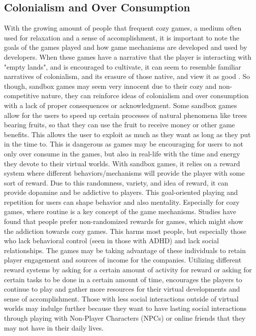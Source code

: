 \documentclass[10pt,twocolumn]{article}
\begin{document}
\subsection{Colonialism and Over Consumption}
With the growing amount of people that frequent cozy games, a medium often used for relaxation and a sense of accomplishment, it is important to note the goals of the games played and how game mechanisms are developed and used by developers. When these games have a narrative that the player is interacting with "empty lands", and is encouraged to cultivate, it can seem to resemble familiar narratives of colonialism, and its erasure of those native, and view it as good \cite{USA_Smith_2022}. So though, sandbox games may seem very innocent due to their cozy and non-competitive nature, they can reinforce ideas of colonialism and over consumption with a lack of proper consequences or acknowledgment. Some sandbox games allow for the users to speed up certain processes of natural phenomena like trees bearing fruits, so that they can use the fruit to receive money or other game benefits. This allows the user to exploit as much as they want as long as they put in the time to. This is dangerous as games may be encouraging for users to not only over consume in the games, but also in real-life with the time and energy they devote to their virtual worlds. With sandbox games, it relies on a reward system where different behaviors/mechanisms will provide the player with some sort of reward. Due to this randomness, variety, and idea of reward, it can provide dopamine and be addictive to players\cite{Staewen_Trevino_Chang_Yun_2014}. This goal-oriented playing and repetition for users can shape behavior and also mentality. Especially for cozy games, where routine is a key concept of the game mechanisms. Studies have found that people prefer non-randomized rewards for games, which might show the addiction towards cozy games.\cite{Staewen_Trevino_Chang} This harms most people, but especially those who lack behavioral control (seen in those with ADHD) and lack social relationships\cite{Eijnden_Peeters_2024}. The games may be taking advantage of these individuals to retain player engagement and sources of income for the companies. Utilizing different reward systems by asking for a certain amount of activity for reward or asking for certain tasks to be done in a certain amount of time, encourages the players to continue to play and gather more resources for their virtual developments and sense of accomplishment. Those with less social interactions outside of virtual worlds may indulge further because they want to have lasting social interactions through playing with Non-Player Characters (NPCs) or online friends that they may not have in their daily lives.\cite{Eijnden_Peeters_2024}
\end{document}
